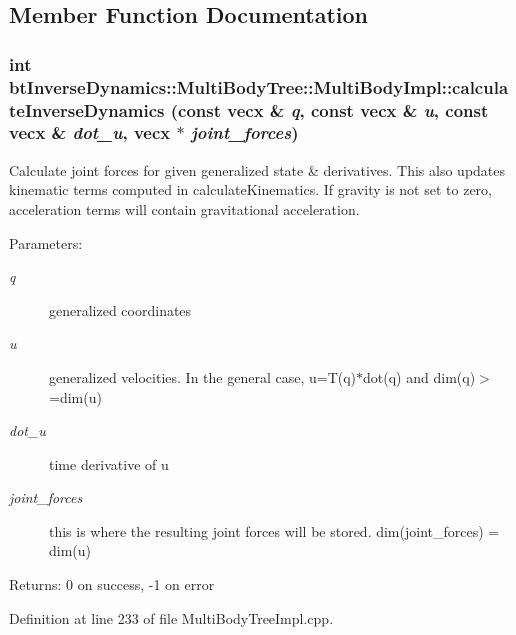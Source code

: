 \subsection{Member Function Documentation}
\hypertarget{classbt_inverse_dynamics_1_1_multi_body_tree_1_1_multi_body_impl_408ca0c5fe8fcd75b2b8672e96c2237a}{
\subsubsection[calculateInverseDynamics]{\setlength{\rightskip}{0pt plus 5cm}int btInverseDynamics::MultiBodyTree::MultiBodyImpl::calculateInverseDynamics (const vecx \& {\em q}, \/  const vecx \& {\em u}, \/  const vecx \& {\em dot\_\-u}, \/  vecx $\ast$ {\em joint\_\-forces})}}
\label{classbt_inverse_dynamics_1_1_multi_body_tree_1_1_multi_body_impl_408ca0c5fe8fcd75b2b8672e96c2237a}


Calculate joint forces for given generalized state \& derivatives. This also updates kinematic terms computed in calculateKinematics. If gravity is not set to zero, acceleration terms will contain gravitational acceleration. \begin{Desc}
\item[Parameters:]
\begin{description}
\item[{\em q}]generalized coordinates \item[{\em u}]generalized velocities. In the general case, u=T(q)$\ast$dot(q) and dim(q)$>$=dim(u) \item[{\em dot\_\-u}]time derivative of u \item[{\em joint\_\-forces}]this is where the resulting joint forces will be stored. dim(joint\_\-forces) = dim(u) \end{description}
\end{Desc}
\begin{Desc}
\item[Returns:]0 on success, -1 on error \end{Desc}
 

Definition at line 233 of file MultiBodyTreeImpl.cpp.

